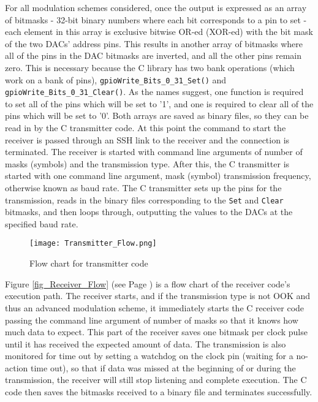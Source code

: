 \documentclass[../main.tex]{subfiles}
\begin{document}
For all modulation schemes considered, once the output is expressed as an array of bitmasks - 32-bit binary numbers where each bit corresponds to a pin to set - each element in this array is exclusive bitwise OR-ed (XOR-ed) with the bit mask of the two DACs' address pins.
This results in another array of bitmasks where all of the pins in the DAC bitmasks are inverted, and all the other pins remain zero.
This is necessary because the C library has two bank operations (which work on a bank of pins), \colorbox{backcolour}{\lstinline{gpioWrite_Bits_0_31_Set()}} and \colorbox{backcolour}{\lstinline{gpioWrite_Bits_0_31_Clear()}}.
As the names suggest, one function is required to set all of the pins which will be set to '1', and one is required to clear all of the pins which will be set to '0'.
Both arrays are saved as binary files, so they can be read in by the C transmitter code.
At this point the command to start the receiver is passed through an SSH link to the receiver and the connection is terminated.
The receiver is started with command line arguments of number of masks (symbols) and the transmission type.
After this, the C transmitter is started with one command line argument, mask (symbol) transmission frequency, otherwise known as baud rate.
The C transmitter sets up the pins for the transmission, reads in the binary files corresponding to the \colorbox{backcolour}{\lstinline{Set}} and \colorbox{backcolour}{\lstinline{Clear}} bitmasks, and then loops through, outputting the values to the DACs at the specified baud rate.\\

\begin{figure}[ht]
 	\centering
 	\texttt{[image: Transmitter\_Flow.png]}
 	\caption{Flow chart for transmitter code}
 	\label{fig_Transmitter_Flow}
\end{figure}


\clearpage

Figure \ref{fig_Receiver_Flow} (see Page \pageref{fig_Receiver_Flow}) is a flow chart of the receiver code's execution path.
The receiver starts, and if the transmission type is not OOK and thus an advanced modulation scheme, it immediately starts the C receiver code passing the command line argument of number of masks so that it knows how much data to expect.
This part of the receiver saves one bitmask per clock pulse until it has received the expected amount of data.
The transmission is also monitored for time out by setting a watchdog on the clock pin (waiting for a no-action time out), so that if data was missed at the beginning of or during the transmission, the receiver will still stop listening and complete execution.
The C code then saves the bitmasks received to a binary file and terminates successfully.\\
\end{document}

